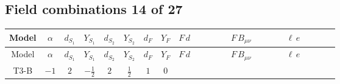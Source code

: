 \documentclass[8pt]{article}
\begin{document}
\begin{landscape}
\subsection*{Field combinations 14 of 27}
\begin{longtable}{@{}cccccccc >{\raggedright\arraybackslash}p{0.21\linewidth} >{\raggedright\arraybackslash}p{0.21\linewidth} >{\raggedright\arraybackslash}p{0.21\linewidth}@{}}
\toprule
Model & $\alpha$ & $d_{S_1}$ & $Y_{S_1}$ & $d_{S_2}$ & $Y_{S_2}$ & $d_F$ & $Y_F$ & $F\,d$ & $F\,B_{\mu\nu}$ & $\ell\,e$ \\
\midrule
\endfirsthead
\toprule
Model & $\alpha$ & $d_{S_1}$ & $Y_{S_1}$ & $d_{S_2}$ & $Y_{S_2}$ & $d_F$ & $Y_F$ & $F\,d$ & $F\,B_{\mu\nu}$ & $\ell\,e$ \\
\midrule
\endhead
T3-B & $-1$ & $2$ & $-\frac{1}{2}$ & $2$ & $\frac{1}{2}$ & $1$ & $0$ & \scriptsize\adjustbox{max width=\linewidth}{$\begin{gathered} -\frac{\hbar  \text{Delta}\left(i_1,i_4\right) \overline{y_{1,i_2,r_2}} \overline{d_{\alpha _1,i_4}}\, \gamma ^{\mu _1}\, P_R\, d_{\alpha _1,i_1} F_{r_2}{}^T\, C\, \gamma ^{\mu _1}\, P_R\, F_{r_3} g_1^2 y_{1,i_2,r_3}}{9 \epsilon  m_1^2} \\ -\frac{\hbar  \text{Delta}\left(i_1,i_4\right) \overline{y_{1,i_2,r_2}} \overline{d_{\alpha _1,i_4}}\, \gamma ^{\mu _1}\, P_R\, d_{\alpha _1,i_1} F_{r_2}{}^T\, C\, \gamma ^{\mu _1}\, P_R\, F_{r_3} g_1^2 y_{1,i_2,r_3}}{6 m_1^2} \\ -\frac{\hbar  \text{Delta}\left(i_1,i_4\right) \log \left(\frac{\bar{\mu}^{2}}{m_1^2}\right) \overline{y_{1,i_2,r_2}} \overline{d_{\alpha _1,i_4}}\, \gamma ^{\mu _1}\, P_R\, d_{\alpha _1,i_1} F_{r_2}{}^T\, C\, \gamma ^{\mu _1}\, P_R\, F_{r_3} g_1^2 y_{1,i_2,r_3}}{9 m_1^2}\end{gathered}$} & \scriptsize\adjustbox{max width=\linewidth}{$\begin{gathered} -\frac{i \hbar  \overline{y_{1,i_1,r_1}} F_{r_1}{}^T\, C\, \gamma ^{\mu _1}\, \gamma ^{\mu _2}\, P_R\, F_{r_2} B_{\mu _1\mu _2} M_F y_{1,i_1,r_2}}{8 m_1^2} \\ -\frac{i \hbar  \overline{y_{1,i_1,r_1}} F_{r_2}{}^T\, C\, \gamma ^{\mu _2}\, \gamma ^{\mu _1}\, P_L\, F_{r_1} B_{\mu _1\mu _2} M_F y_{1,i_1,r_2}}{8 m_1^2}\end{gathered}$} & \scriptsize\adjustbox{max width=\linewidth}{$\begin{gathered} +\frac{\hbar  \overline{y_{1,i_2,r_1}} \overline{e_{i_3}}\, \gamma ^{\mu _1}\, P_R\, e_{i_3} \overline{L_{a_1,i_4}}\, \gamma ^{\mu _1}\, P_L\, L_{a_1,i_2} g_1^2 y_{1,i_4,r_1}}{36 m_1^2} \\ -\frac{\hbar  \text{Delta}\left(i_2,i_4\right) \overline{e_{i_3}}\, \gamma ^{\mu _1}\, P_R\, e_{i_3} \overline{L_{a_1,i_4}}\, \gamma ^{\mu _1}\, P_L\, L_{a_1,i_2} g_1^4}{120 m_1^2}\end{gathered}$} \\
\midrule
\bottomrule
\end{longtable}
\clearpage

\end{landscape}
\end{document}
